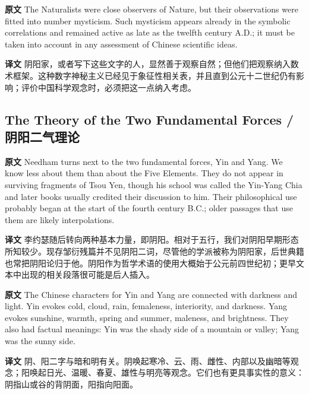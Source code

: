 \documentclass[UTF8,zihao=-4]{ctexart}
\newcommand{\BodyFont}{\fontsize{10.5pt}{15.5pt}\selectfont}
\newcommand{\origlabel}{\textbf{原文}\quad}
\newcommand{\translabel}{\textbf{译文}\quad}
\newenvironment{enblock}{\par\noindent\begingroup\BodyFont\origlabel}{\par\endgroup}
\newenvironment{zhblock}{\par\noindent\begingroup\BodyFont\translabel}{\par\endgroup\vspace{0.35em}}
\begin{document}
\begin{enblock}
The Naturalists were close observers of Nature, but their observations were fitted into number mysticism. Such mysticism appears already in the symbolic correlations and remained active as late as the twelfth century A.D.; it must be taken into account in any assessment of Chinese scientific ideas.
\end{enblock}
\begin{zhblock}
阴阳家，或者写下这些文字的人，显然善于观察自然；但他们把观察纳入数术框架。这种数字神秘主义已经见于象征性相关表，并且直到公元十二世纪仍有影响；评价中国科学观念时，必须把这一点纳入考虑。
\end{zhblock}

\subsection*{The Theory of the Two Fundamental Forces / 阴阳二气理论}

\begin{enblock}
Needham turns next to the two fundamental forces, Yin and Yang. We know less about them than about the Five Elements. They do not appear in surviving fragments of Tsou Yen, though his school was called the Yin-Yang Chia and later books usually credited their discussion to him. Their philosophical use probably began at the start of the fourth century B.C.; older passages that use them are likely interpolations.
\end{enblock}
\begin{zhblock}
李约瑟随后转向两种基本力量，即阴阳。相对于五行，我们对阴阳早期形态所知较少。现存邹衍残篇并不见阴阳二词，尽管他的学派被称为阴阳家，后世典籍也常把阴阳论归于他。阴阳作为哲学术语的使用大概始于公元前四世纪初；更早文本中出现的相关段落很可能是后人插入。
\end{zhblock}

\begin{enblock}
The Chinese characters for Yin and Yang are connected with darkness and light. Yin evokes cold, cloud, rain, femaleness, interiority, and darkness. Yang evokes sunshine, warmth, spring and summer, maleness, and brightness. They also had factual meanings: Yin was the shady side of a mountain or valley; Yang was the sunny side.
\end{enblock}
\begin{zhblock}
阴、阳二字与暗和明有关。阴唤起寒冷、云、雨、雌性、内部以及幽暗等观念；阳唤起日光、温暖、春夏、雄性与明亮等观念。它们也有更具事实性的意义：阴指山或谷的背阴面，阳指向阳面。
\end{zhblock}
\end{document}
